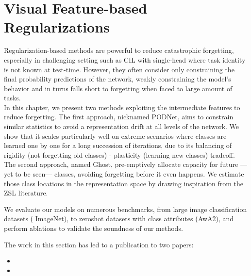 \chapter{Visual Feature-based Regularizations}
\label{chapter:regularization}

\newcommand{\tableindent}{\,\,\,\,}
\newcommand{\vt}{\mathbf{t}}
\newcommand{\std}{$\pm\,$}
\newcommand{\clf}{\textit{clf}} \newcommand{\gray}[1]{{\color{darkgray}#1}}


\begin{chapabstract}
    Regularization-based methods are powerful to reduce catastrophic forgetting, especially in
    challenging setting such as \ac{CIL} with single-head where task identity is not known at
    test-time. However, they often consider only constraining the final probability predictions of
    the network, weakly constraining the model's behavior and in turns falls short to forgetting
    when faced to large amount of tasks. \\
    In this chapter, we present two methods exploiting the intermediate features to reduce
    forgetting. The first approach, nicknamed PODNet, aims to constrain similar statistics to avoid
    a representation drift at all levels of the network. We show that it scales particularly well on
    extreme scenarios where classes are learned one by one for a long succession of iterations, due
    to its balancing of rigidity (not forgetting old classes) - plasticity (learning new classes)
    tradeoff. The second approach, named Ghost, pre-emptively allocate capacity for future ---yet to
    be seen--- classes, avoiding forgetting before it even happens. We estimate those class
    locations in the representation space by drawing inspiration from the \ac{ZSL} literature.

    We evaluate our models on numerous benchmarks, from large image classification datasets (\eg
    ImageNet), to zeroshot datasets with class attributes (\eg AwA2), and perform ablations to
    validate the soundness of our methods.

    The work in this section has led to a publication to two papers:

    \begin{itemize}
        \item {}
        \item {}
    \end{itemize}

\end{chapabstract}
\newpage

